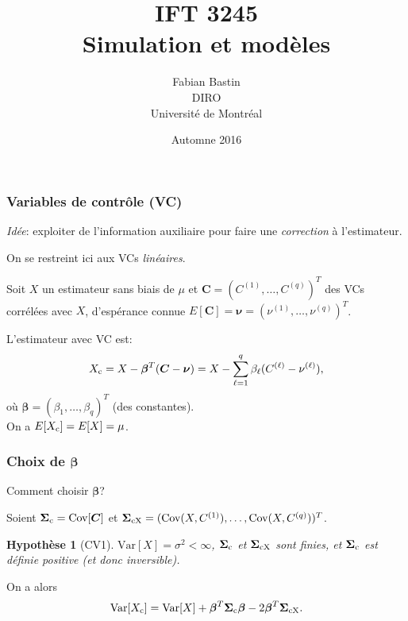 \documentclass[t,usepdftitle=false]{beamer}
\title[IFT3245]{IFT 3245\\Simulation et modèles}
\author[Fabian Bastin]{Fabian Bastin\\DIRO\\Université de Montréal}
\date{Automne 2016}
\def\bC{\boldsymbol{C}}
\def\bbeta{\boldsymbol{\beta}}
\def\bnu{\boldsymbol{\nu}}
\def\bSigma{\boldsymbol{\Sigma}}
\def\Var{\mbox{Var}}
\def\Cov{\mbox{Cov}}
\newtheorem{assumption}{Hypothèse}
\begin{document}
\frame{\titlepage}

\begin{frame}
\frametitle{Variables de contrôle (VC)}

\emph{Idée}: exploiter de l'information auxiliaire pour faire une
\emph{correction} \`a l'estimateur.

\mbox{}

On se restreint ici aux VCs \emph{linéaires}.

\mbox{}

Soit ${X}$ un estimateur sans biais de ${\mu}$ et
$\bC = ({C^{(1)}},\dots,{C^{(q)}})^T$ des VCs
corrélées avec $X$, d'espérance connue 
$E[\bC] = \bnu = ({\nu^{(1)}},\dots,{\nu^{(q)}})^T$.

\mbox{}

L'estimateur avec VC est:
\[ {X_{\rm c}} = X - \bbeta^T (\bC-\bnu)
             = X - \sum_{\ell=1}^q \beta_\ell (C^{(\ell)}-\nu^{(\ell)}),
\]
o\`u $\bbeta = ({\beta_1},\dots,{\beta_q})^T$ (des constantes).\\
On a $E[X_{\rm c}] = E[X] = \mu$.

\end{frame}

\begin{frame}
\frametitle{Choix de $\bbeta$}

Comment choisir $\bbeta$?

\mbox{}

Soient ${\bSigma_{\rm c}} = \Cov[\bC]$ et 
${\bSigma_{\rm c\rm X}} = (\Cov(X,C^{(1)}),\ldots,\Cov(X,C^{(q)}))^T$.

\mbox{}

\begin{assumption}[CV1]
$\Var[X] = {\sigma^2} < \infty$, 
$\bSigma_{\rm c}$ et $\bSigma_{\rm c\rm X}$ sont finies, et
$\bSigma_{\rm c}$ est définie positive (et donc inversible).
\end{assumption}

\mbox{}

On a alors
$$ \Var[X_{\rm c}] = \Var[X] + \bbeta^T\bSigma_{\rm c}\bbeta 
 - 2\bbeta^T\bSigma_{\rm c\rm X}.$$

\end{frame}
\end{document}
